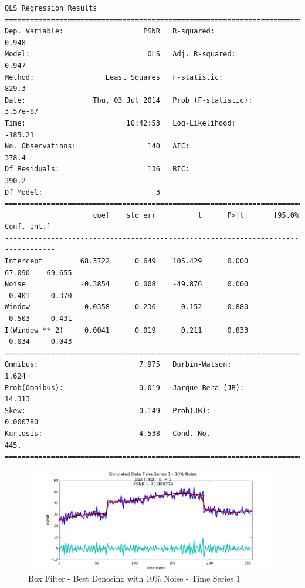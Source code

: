 \documentclass[11pt]{article}
\theoremstyle{definition}
\begin{document}
{\begin{lstlisting}[caption = Time Series 3 - Box Filter OLS Model, label = {boxfilterseries3}]
                            OLS Regression Results                            
==============================================================================
Dep. Variable:                   PSNR   R-squared:                       0.948
Model:                            OLS   Adj. R-squared:                  0.947
Method:                 Least Squares   F-statistic:                     829.3
Date:                Thu, 03 Jul 2014   Prob (F-statistic):           3.57e-87
Time:                        10:42:53   Log-Likelihood:                -185.21
No. Observations:                 140   AIC:                             378.4
Df Residuals:                     136   BIC:                             390.2
Df Model:                           3                                         
==================================================================================
                     coef    std err          t      P>|t|      [95.0% Conf. Int.]
----------------------------------------------------------------------------------
Intercept         68.3722      0.649    105.429      0.000        67.090    69.655
Noise             -0.3854      0.008    -49.876      0.000        -0.401    -0.370
Window            -0.0358      0.236     -0.152      0.880        -0.503     0.431
I(Window ** 2)     0.0041      0.019      0.211      0.833        -0.034     0.043
==============================================================================
Omnibus:                        7.975   Durbin-Watson:                   1.624
Prob(Omnibus):                  0.019   Jarque-Bera (JB):               14.313
Skew:                          -0.149   Prob(JB):                     0.000780
Kurtosis:                       4.538   Cond. No.                         445.
==============================================================================
\end{lstlisting}
}

\begin{figure}
\centering
\includegraphics[width = 0.75 \textwidth]{BoxSignal1Best.png}
\caption{Box Filter - Best Denosing with 10\% Noise - Time Series 1}
\label{box1best}
\end{figure}
\end{document}
